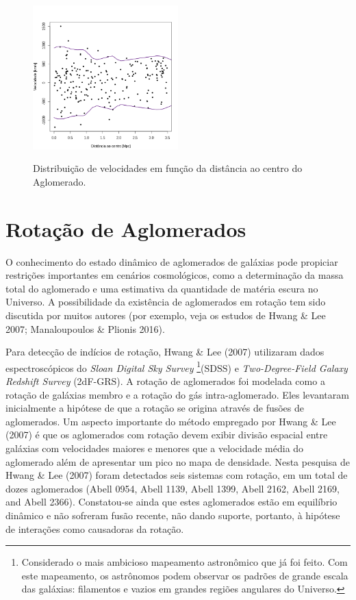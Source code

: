 \begin{figure}[!htb]
	\centering
	\caption{Distribuição de velocidades em função da distância ao centro do Aglomerado.}
	\includegraphics[width=0.5\textwidth]{04-figuras/10043}
	\label{fig2}
\end{figure}

\chapter{Rotação de Aglomerados}

O conhecimento do estado dinâmico de aglomerados de galáxias pode propiciar restrições importantes em cenários cosmológicos, como a determinação da massa total do aglomerado e uma estimativa da quantidade de matéria escura no Universo. A possibilidade da existência de aglomerados em rotação tem sido discutida por muitos autores (por exemplo, veja os estudos de Hwang \& Lee 2007; Manaloupoulos \& Plionis 2016). 

Para detecção de indícios de rotação, Hwang \& Lee (2007) utilizaram dados espectroscópicos do \textit{Sloan Digital Sky Survey} \footnote{Considerado o mais ambicioso mapeamento astronômico que já foi feito. Com este mapeamento, os astrônomos podem observar os padrões de grande escala das galáxias: filamentos e vazios em grandes regiões angulares do Universo.}(SDSS) e \textit{Two-Degree-Field Galaxy Redshift Survey} (2dF-GRS). A rotação de aglomerados foi modelada como a rotação de galáxias membro e a rotação do gás intra-aglomerado. Eles levantaram inicialmente a hipótese de que a rotação se origina através de fusões de aglomerados. Um aspecto importante do método empregado por Hwang \& Lee (2007) é que os aglomerados com rotação devem exibir divisão espacial entre galáxias com velocidades maiores e menores que a velocidade média do aglomerado além de apresentar um pico no mapa de densidade. Nesta pesquisa de Hwang \& Lee (2007) foram detectados seis sistemas com rotação, em um total de dozes aglomerados (Abell 0954, Abell 1139, Abell 1399, Abell 2162, Abell 2169, and Abell 2366). Constatou-se ainda que estes aglomerados estão em equilíbrio dinâmico e não sofreram fusão recente, não dando suporte, portanto, à hipótese de interações como causadoras da rotação. 

